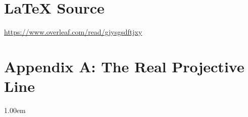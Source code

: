 \documentclass{article}
\theoremstyle{definition}
\begin{document}
\section*{\LaTeX \hspace{0.025 mm} Source}
\url{https://www.overleaf.com/read/gjysgsdftjxy}
%
%
%


%
%
%
\section*{Appendix A: The Real Projective Line}

\setlength			{\fboxsep} {1.00em}						%
\setlength			{\fboxrule}{0.25pt}						%
\def \scalefactor	{0.95}									%
\def \minipagescale	{0.50}									%
\def \twidth		{\textwidth}							%
\end{document}
